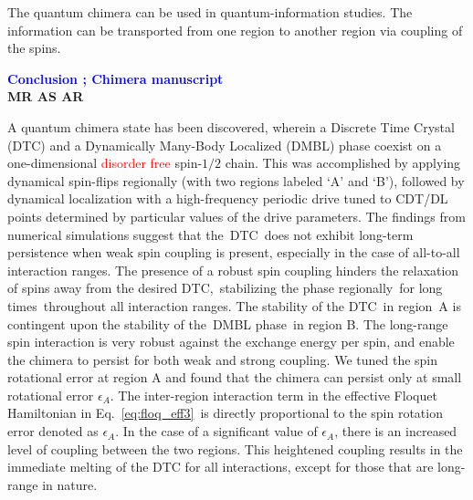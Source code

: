 \documentclass[a4paper,11pt]{article}
\newcommand{\red}[1]{\textcolor{red}{#1}}
\newcommand{\blue}[1]{\textcolor{blue}{#1}}
\begin{document}
The quantum chimera can be used in quantum-information studies. The information can be transported from one region to another region via coupling of the spins\cite{VIENNOT2016678}. 
\vskip 1cm
\begin{center}
	{\large\bf \blue{Conclusion ; Chimera manuscript}}\\
	{\tiny \bf MR AS AR}
\end{center}

A quantum chimera state has been discovered, wherein a Discrete Time Crystal (DTC) and a Dynamically Many-Body Localized (DMBL) phase coexist on a one-dimensional \red{disorder free} spin-$1/2$ chain. This was accomplished  by applying dynamical spin-flips regionally (with two regions labeled `A' and `B'), followed by dynamical localization with a high-frequency periodic drive tuned to CDT/DL points determined by particular values of the drive parameters. The findings from numerical simulations suggest that the DTC does not exhibit long-term persistence when weak spin coupling is present, especially in the case of all-to-all interaction ranges. The presence of a robust spin coupling hinders the relaxation of spins away from the desired DTC, stabilizing the phase regionally for long times throughout all interaction ranges. The stability of the DTC in region A is contingent upon the stability of the DMBL phase in region B. The long-range spin interaction is very robust against the exchange energy per spin, and enable the chimera to persist for both weak and strong coupling. We tuned the spin rotational error at region A and found that the chimera can persist only at small rotational error $\epsilon_A$. The inter-region interaction term in the effective Floquet Hamiltonian in Eq.~\ref{eq:floq_eff3} is directly proportional to the spin rotation error denoted as $\epsilon_A$. In the case of a significant value of $\epsilon_A$, there is an increased level of coupling between the two regions. This heightened coupling results in the immediate melting of the DTC for all interactions, except for those that are long-range in nature.
\end{document}
